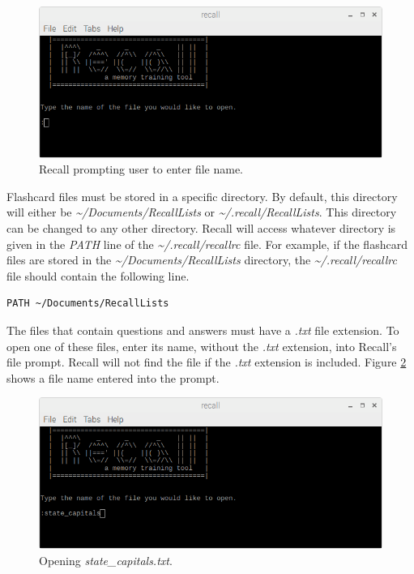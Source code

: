 \documentclass[letterpaper]{article}
\begin{document}
\begin{figure}[H]
  \centering
  \includegraphics[width=14cm]{images/running/enter_file.png}
  \caption{Recall prompting user to enter file name.}
  \label{fig:enter_file_name}
\end{figure}

Flashcard files must be stored in a specific directory. By default, this directory will either be \textit{\~{}/Documents/RecallLists} or \textit{\~{}/.recall/RecallLists}. This directory can be changed to any other directory. Recall will access whatever directory is given in the \textit{PATH} line of the \textit{\~{}/.recall/recallrc} file. For example, if the flashcard files are stored in the \textit{\~{}/Documents/RecallLists} directory, the \textit{\~{}/.recall/recallrc} file should contain the following line.
\begin{verbatim}
PATH ~/Documents/RecallLists
\end{verbatim}

The files that contain questions and answers must have a \textit{.txt} file extension. To open one of these files, enter its name, without the \textit{.txt} extension, into Recall's file prompt. Recall will not find the file if the \textit{.txt} extension is included. Figure \ref{fig:entering_file_name} shows a file name entered into the prompt.

\begin{figure}[H]
  \centering
  \includegraphics[width=14cm]{images/running/entered_file.png}
  \caption{Opening \textit{state\_capitals.txt}.}
  \label{fig:entering_file_name}
\end{figure}
\end{document}
